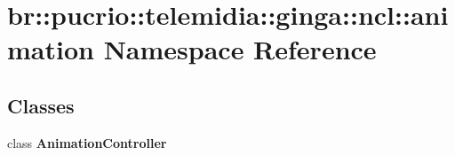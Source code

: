 \section{br::pucrio::telemidia::ginga::ncl::animation Namespace Reference}
\label{namespacebr_1_1pucrio_1_1telemidia_1_1ginga_1_1ncl_1_1animation}


\subsection*{Classes}
\begin{CompactItemize}
\item 
class {\bf AnimationController}
\end{CompactItemize}
